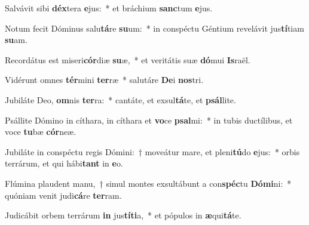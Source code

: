 \item Salvávit sibi \textbf{déx}tera \textbf{e}jus:~* et bráchium \textbf{sanc}tum \textbf{e}jus.
\item Notum fecit Dóminus salu\textbf{tá}re \textbf{su}um:~* in conspéctu Géntium revelávit jus\textbf{tí}tiam \textbf{su}am.
\item Recordátus est miseri\textbf{cór}diæ \textbf{su}æ,~* et veritátis suæ \textbf{dó}mui \textbf{Is}raël.
\item Vidérunt omnes \textbf{tér}mini \textbf{ter}ræ~* salutáre \textbf{De}i \textbf{nos}tri.
\item Jubiláte Deo, \textbf{om}nis \textbf{ter}ra:~* cantáte, et exsul\textbf{tá}te, et \textbf{psál}lite.
\item Psállite Dómino in cíthara, in cíthara et \textbf{vo}ce \textbf{psal}mi:~* in tubis ductílibus, et voce \textbf{tu}bæ \textbf{cór}neæ.
\item Jubiláte in conspéctu regis Dómini:~† moveátur mare, et pleni\textbf{tú}do \textbf{e}jus:~* orbis terrárum, et qui hábi\textbf{tant} in \textbf{e}o.
\item Flúmina plaudent manu,~† simul montes exsultábunt a con\textbf{spéc}tu \textbf{Dó}\textbf{mi}ni:~* quóniam venit judi\textbf{cá}re \textbf{ter}ram.
\item Judicábit orbem terrárum \textbf{in} jus\textbf{tí}\textbf{ti}a,~* et pópulos in \textbf{æ}qui\textbf{tá}te.
